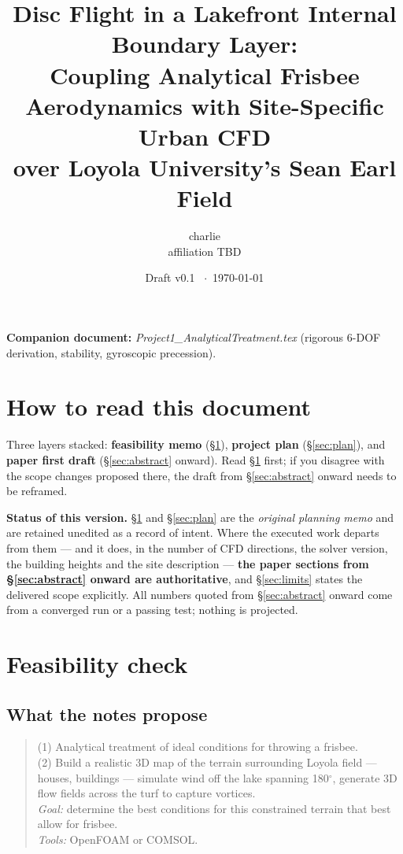 \documentclass[11pt,letterpaper]{article}
\title{\bfseries Disc Flight in a Lakefront Internal Boundary Layer:\\Coupling Analytical Frisbee Aerodynamics with Site-Specific Urban CFD\\over Loyola University's Sean Earl Field}
\author{charlie\\\small affiliation TBD}
\date{Draft v0.1 \ $\cdot$\ \today}
\begin{document}
\maketitle

\noindent\textbf{Companion document:} \emph{Project1\_AnalyticalTreatment.tex} (rigorous 6-DOF derivation, stability, gyroscopic precession).

\section*{How to read this document}

Three layers stacked: \textbf{feasibility memo} (\S\ref{sec:feas}), \textbf{project plan} (\S\ref{sec:plan}), and \textbf{paper first draft} (\S\ref{sec:abstract} onward). Read \S\ref{sec:feas} first; if you disagree with the scope changes proposed there, the draft from \S\ref{sec:abstract} onward needs to be reframed.

\begin{tcolorbox}[colback=boxbg,colframe=accent,boxrule=0.6pt,left=6pt,
                  right=6pt,top=4pt,bottom=4pt]
\small\textbf{Status of this version.} \S\ref{sec:feas} and \S\ref{sec:plan}
are the \emph{original planning memo} and are retained unedited as a record of
intent. Where the executed work departs from them --- and it does, in the
number of CFD directions, the solver version, the building heights and the site
description --- \textbf{the paper sections from \S\ref{sec:abstract} onward are
authoritative}, and \S\ref{sec:limits} states the delivered scope explicitly.
All numbers quoted from \S\ref{sec:abstract} onward come from a converged run
or a passing test; nothing is projected.
\end{tcolorbox}

\section{Feasibility check}
\label{sec:feas}

\subsection{What the notes propose}

\begin{quote}
(1) Analytical treatment of ideal conditions for throwing a frisbee.\\
(2) Build a realistic 3D map of the terrain surrounding Loyola field --- houses, buildings --- simulate wind off the lake spanning 180$^\circ$, generate 3D flow fields across the turf to capture vortices.\\
\emph{Goal:} determine the best conditions for this constrained terrain that best allow for frisbee.\\
\emph{Tools:} OpenFOAM or COMSOL.
\end{quote}
\end{document}
